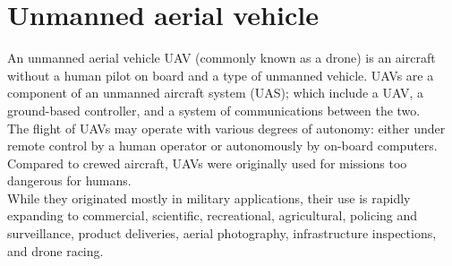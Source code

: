 \section{Unmanned aerial vehicle}
\label{sec:unmanned-aerial-vehicle}
%
%
An unmanned aerial vehicle UAV (commonly known as a drone) is an aircraft 
without a human pilot on board and a type of unmanned vehicle. 
UAVs are a component of an unmanned aircraft system (UAS); which include a UAV,
a ground-based controller, and a system of communications between the two.\\
The flight of UAVs may operate with various degrees of autonomy: either under
remote control by a human operator or autonomously by on-board computers.
Compared to crewed aircraft, UAVs were originally used for missions too
dangerous for humans.\cite{budiansky2005air}\\
While they originated mostly in military applications, their use is rapidly
expanding to commercial, scientific, recreational, agricultural, policing and
surveillance, product deliveries, aerial photography, infrastructure
inspections, and drone racing.\cite{wiki:uav}
%
%
\begin{figure}[htb]
    \centering
     \\
    \label{fig:uavs-image}
\end{figure}
%
%
